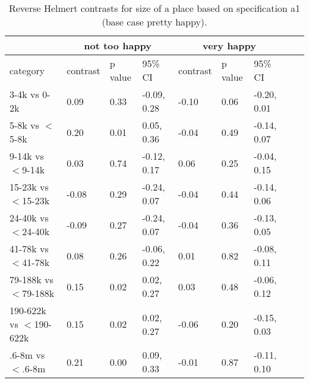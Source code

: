 \documentclass[12pt, letterpaper]{article}
\begin{document}
\begin{spacing}{1.9}
\begin{table}[H]\centering\footnotesize
\caption{\label{HE-siz}  Reverse Helmert contrasts for size of a place
  based on specification a1 (base case pretty happy).}
\begin{tabular}{llll|lllll}   \hline 
&\multicolumn{3}{c}{not too happy}&\multicolumn{3}{c}{very happy}\\\hline
 category&  contrast&   p value&     95\% CI& contrast&   p value&     95\% CI\\
        3-4k vs  0-2k  & 0.09&0.33&-0.09, 0.28&-0.10&  0.06& -0.20, 0.01\\
        5-8k vs $<$5-8k& 0.20&0.01& 0.05, 0.36&-0.04&  0.49& -0.14, 0.07\\
      9-14k vs $<$9-14k& 0.03&0.74&-0.12, 0.17& 0.06&  0.25& -0.04, 0.15\\
    15-23k vs $<$15-23k&-0.08&0.29&-0.24, 0.07&-0.04&  0.44& -0.14, 0.06\\
    24-40k vs $<$24-40k&-0.09&0.27&-0.24, 0.07&-0.04&  0.36& -0.13, 0.05\\
    41-78k vs $<$41-78k& 0.08&0.26&-0.06, 0.22& 0.01&  0.82& -0.08, 0.11\\
  79-188k vs $<$79-188k& 0.15&0.02& 0.02, 0.27& 0.03&  0.48& -0.06, 0.12\\
190-622k vs $<$190-622k& 0.15&0.02& 0.02, 0.27&-0.06&  0.20& -0.15, 0.03\\
      .6-8m vs $<$.6-8m& 0.21&0.00& 0.09, 0.33&-0.01&  0.87& -0.11, 0.10\\\hline
\end{tabular}\end{table}


\end{spacing}
\end{document}
